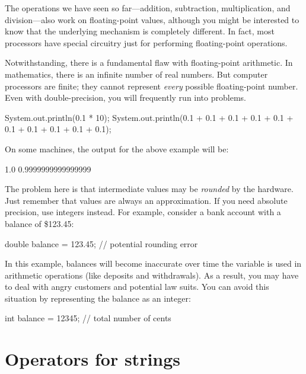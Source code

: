 
The operations we have seen so far---addition, subtraction, multiplication, and division---also work on floating-point values, although you might be interested to know that the underlying mechanism is completely different.
In fact, most processors have special circuitry just for performing floating-point operations.

Notwithstanding, there is a fundamental flaw with floating-point arithmetic.
In mathematics, there is an infinite number of real numbers.
But computer processors are finite; they cannot represent {\em every} possible floating-point number.
Even with double-precision, you will frequently run into problems.

\begin{code}
    System.out.println(0.1 * 10);
    System.out.println(0.1 + 0.1 + 0.1 + 0.1 + 0.1
                     + 0.1 + 0.1 + 0.1 + 0.1 + 0.1);
\end{code}

On some machines, the output for the above example will be:

\begin{stdout}
    1.0
    0.9999999999999999
\end{stdout}

The problem here is that intermediate values may be {\em rounded} by the hardware.
Just remember that  values are always an approximation.
If you need absolute precision, use integers instead.
For example, consider a bank account with a balance of \$123.45:

\begin{code}
    double balance = 123.45;  // potential rounding error
\end{code}

In this example, balances will become inaccurate over time the variable is used in arithmetic operations (like deposits and withdrawals).
As a result, you may have to deal with angry customers and potential law suits.
You can avoid this situation by representing the balance as an integer:

\begin{code}
    int balance = 12345;      // total number of cents
\end{code}


\section{Operators for strings}

